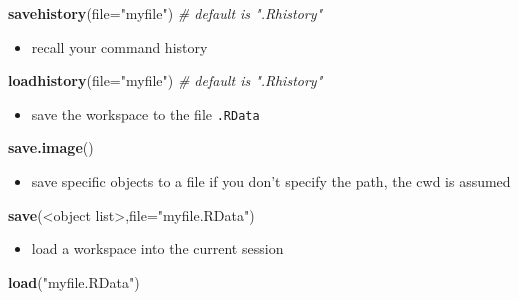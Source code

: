 \documentclass[]{article}
\def\tightlist{}
\newenvironment{Shaded}{\begin{snugshade}}{\end{snugshade}}
\newcommand{\KeywordTok}[1]{\textcolor[rgb]{0.13,0.29,0.53}{\textbf{{#1}}}}
\newcommand{\DataTypeTok}[1]{\textcolor[rgb]{0.13,0.29,0.53}{{#1}}}
\newcommand{\StringTok}[1]{\textcolor[rgb]{0.31,0.60,0.02}{{#1}}}
\newcommand{\CommentTok}[1]{\textcolor[rgb]{0.56,0.35,0.01}{\textit{{#1}}}}
\newcommand{\NormalTok}[1]{{#1}}
\numberwithin{equation}{section}
\begin{document}
\begin{Shaded}
\begin{Highlighting}[]
\KeywordTok{savehistory}\NormalTok{(}\DataTypeTok{file=}\StringTok{"myfile"}\NormalTok{) }\CommentTok{# default is ".Rhistory"}
\end{Highlighting}
\end{Shaded}

\begin{itemize}
\tightlist
\item
  recall your command history
\end{itemize}

\begin{Shaded}
\begin{Highlighting}[]
\KeywordTok{loadhistory}\NormalTok{(}\DataTypeTok{file=}\StringTok{"myfile"}\NormalTok{) }\CommentTok{# default is ".Rhistory"}
\end{Highlighting}
\end{Shaded}

\begin{itemize}
\tightlist
\item
  save the workspace to the file \texttt{.RData}
\end{itemize}

\begin{Shaded}
\begin{Highlighting}[]
\KeywordTok{save.image}\NormalTok{()}
\end{Highlighting}
\end{Shaded}

\begin{itemize}
\tightlist
\item
  save specific objects to a file if you don't specify the path, the cwd
  is assumed
\end{itemize}

\begin{Shaded}
\begin{Highlighting}[]
\KeywordTok{save}\NormalTok{(<object list>,}\DataTypeTok{file=}\StringTok{"myfile.RData"}\NormalTok{) }
\end{Highlighting}
\end{Shaded}

\begin{itemize}
\tightlist
\item
  load a workspace into the current session
\end{itemize}

\begin{Shaded}
\begin{Highlighting}[]
\KeywordTok{load}\NormalTok{(}\StringTok{"myfile.RData"}\NormalTok{) }
\end{Highlighting}
\end{Shaded}
\end{document}
